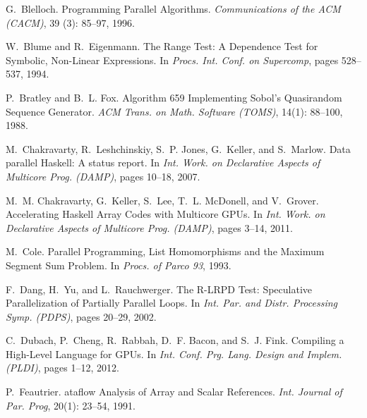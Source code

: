 \documentclass{sigplanconf}  %
\begin{document}
\begin{thebibliography}{49}
G.~Blelloch.
\newblock Programming {P}arallel {A}lgorithms.
\newblock \emph{Communications of the {ACM} (CACM)}, 39 (3):
  85--97, 1996.

W.~Blume and R.~Eigenmann.
\newblock The {R}ange {T}est: {A} {D}ependence {T}est for {S}ymbolic,
  {N}on-{L}inear {E}xpressions.
\newblock In \emph{Procs. Int. Conf. on Supercomp}, pages 528--537, 1994.

P.~Bratley and B.~L. Fox.
\newblock Algorithm 659 {I}mplementing {S}obol's {Q}uasirandom {S}equence
  {G}enerator.
\newblock \emph{ACM Trans. on Math. Software (TOMS)}, 14(1): 88--100,
  1988.

M.~Chakravarty, R.~Leshchinskiy, S.~P. Jones, G.~Keller, and S.~Marlow.
\newblock Data parallel {H}askell: A status report.
\newblock In \emph{Int. Work. on Declarative Aspects of Multicore Prog.
  (DAMP)}, pages 10--18, 2007.

M.~M. Chakravarty, G.~Keller, S.~Lee, T.~L. McDonell, and V.~Grover.
\newblock Accelerating {H}askell {A}rray {C}odes with {M}ulticore {GPUs}.
\newblock In \emph{Int. Work. on Declarative Aspects of Multicore Prog.
  (DAMP)}, pages 3--14, 2011.

M.~Cole.
\newblock Parallel {P}rogramming, {L}ist {H}omomorphisms and the {M}aximum
  {S}egment {S}um {P}roblem.
\newblock In \emph{Procs. of Parco 93}, 1993.

F.~Dang, H.~Yu, and L.~Rauchwerger.
\newblock The {R-LRPD} {T}est: {S}peculative {P}arallelization of {P}artially
  {P}arallel {L}oops.
\newblock In \emph{Int. Par. and Distr. Processing Symp. (PDPS)}, pages 20--29,
  2002.

C.~Dubach, P.~Cheng, R.~Rabbah, D.~F. Bacon, and S.~J. Fink.
\newblock Compiling a {H}igh-{L}evel {L}anguage for {GPU}s.
\newblock In \emph{Int. Conf. Prg. Lang. Design and Implem. (PLDI)}, pages
  1--12, 2012.

P.~Feautrier.
ataflow {A}nalysis of {A}rray and {S}calar {R}eferences.
\newblock \emph{Int. Journal of Par. Prog}, 20(1): 23--54, 1991.


\end{thebibliography}
\end{document}
